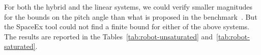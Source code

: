   For both the hybrid and the linear systems, we could
verify smaller magnitudes for the bounds on the pitch angle than what
is proposed in the benchmark~\cite{heinz2014benchmark}.  But the
SpaceEx tool could not find a finite bound for either of the above
systems.  The results are reported in the
Tables~\ref{tab:robot-unsaturated} and~\ref{tab:robot-saturated}.


